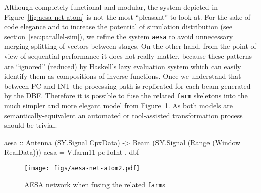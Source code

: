 \documentclass[
  a4paper,
]{article}
\newenvironment{Shaded}{}{}
\newcommand{\DataTypeTok}[1]{\textcolor[rgb]{0.56,0.13,0.00}{#1}}
\newcommand{\FunctionTok}[1]{\textcolor[rgb]{0.02,0.16,0.49}{#1}}
\newcommand{\KeywordTok}[1]{\textcolor[rgb]{0.00,0.44,0.13}{\textbf{#1}}}
\newcommand{\NormalTok}[1]{#1}
\newcommand{\OtherTok}[1]{\textcolor[rgb]{0.00,0.44,0.13}{#1}}
\begin{document}
Although completely functional and modular, the system depicted in
Figure~\ref{fig:aesa-net-atom} is not the most ``pleasant'' to look at.
For the sake of code elegance and to increase the potential of
simulation distribution (see section~\ref{sec:parallel-sim}), we refine
the system \texttt{aesa\textquotesingle{}} to avoid unnecessary
merging-splitting of vectors between stages. On the other hand, from the
point of view of sequential performance it does not really matter,
because these patterns are ``ignored'' (reduced) by Haskell's lazy
evaluation system which can easily identify them as compositions of
inverse functions. Once we understand that between PC and INT the
processing path is replicated for each beam generated by the DBF.
Therefore it is possible to fuse the related \texttt{farm} skeletons
into the much simpler and more elegant model from
Figure~\ref{fig:aesa-net-atom2}. As both models are
semantically-equivalent an automated or tool-assisted transformation
process should be trivial.

\begin{Shaded}
\begin{Highlighting}[numbers=left,,firstnumber=654,]
\OtherTok{aesa ::} \DataTypeTok{Antenna}\NormalTok{ (}\DataTypeTok{SY.Signal} \DataTypeTok{CpxData}\NormalTok{) }\OtherTok{->} \DataTypeTok{Beam}\NormalTok{ (}\DataTypeTok{SY.Signal}\NormalTok{ (}\DataTypeTok{Range}\NormalTok{ (}\DataTypeTok{Window} \DataTypeTok{RealData}\NormalTok{)))}
\NormalTok{aesa }\FunctionTok{=}\NormalTok{ V.farm11 pcToInt }\FunctionTok{.}\NormalTok{ dbf}
\end{Highlighting}
\end{Shaded}

\begin{Shaded}
\end{Shaded}

\begin{figure}
\hypertarget{fig:aesa-net-atom2}{%
\centering
\texttt{[image: figs/aesa-net-atom2.pdf]}
\caption{AESA network when fusing the related
\texttt{farm}s}\label{fig:aesa-net-atom2}
}
\end{figure}
\end{document}
